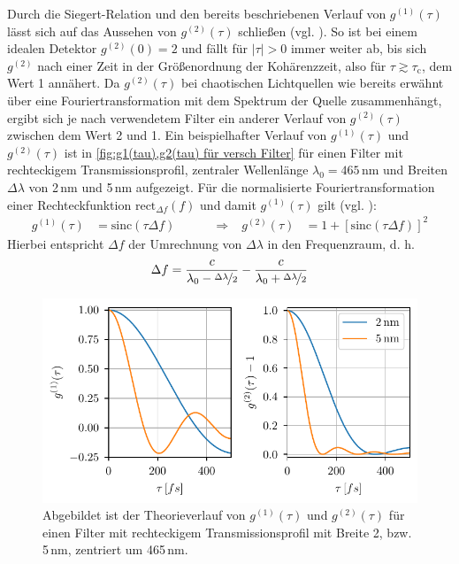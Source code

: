 Durch die Siegert-Relation und den bereits beschriebenen Verlauf von $g^{(1)}(\tau)$ lässt sich auf das Aussehen von $g^{(2)}(\tau)$ schließen (vgl. \cite[Kap. 6.3]{foxQuantumOpticsIntroduction2006}). 
So ist bei einem idealen Detektor $g^{(2)}(0)=2$ und fällt für $|\tau|>0$ immer weiter ab, bis sich $g^{(2)}$ nach einer Zeit in der Größenordnung der Kohärenzzeit, also für $\tau\gtrsim\tau_{\mathrm{c}}$, dem Wert 1 annähert. 
Da $g^{(2)}(\tau)$ bei chaotischen Lichtquellen wie bereits erwähnt über eine Fouriertransformation mit dem Spektrum der Quelle zusammenhängt, ergibt sich je nach verwendetem Filter ein anderer Verlauf von $g^{(2)}(\tau)$ zwischen dem Wert 2 und 1. 
Ein beispielhafter Verlauf von $g^{(1)}(\tau)$ und $g^{(2)}(\tau)$ ist in \autoref{fig:g1(tau),g2(tau) für versch Filter} für einen Filter mit rechteckigem Transmissionsprofil, zentraler Wellenlänge $\lambda_0 = 465\,\mathrm{nm}$ und Breiten $\Delta\lambda$ von 2\,nm und 5\,nm aufgezeigt. 
Für die normalisierte Fouriertransformation einer Rechteckfunktion $\mathrm{rect}_{\Delta f}\left(f\right)$ und damit $g^{(1)}(\tau)$ gilt (vgl. \cite[Kap. 3.2]{wangIntroductionOrthogonalTransforms2012}):
\begin{align}
    g^{(1)}(\tau) &= \mathrm{sinc}\left(\tau\Delta f\right) \quad\quad\quad \Rightarrow& g^{(2)}(\tau) &= 1+ \left[\mathrm{sinc}\left(\tau\Delta f\right)\right]^2
\end{align}
Hierbei entspricht $\Delta f$ der Umrechnung von $\Delta\lambda$ in den Frequenzraum, d. h. 
\begin{equation}
    \Delta f = \frac{c}{\lambda_0 - \nicefrac{\Delta\lambda}{2}} - \frac{c}{\lambda_0 + \nicefrac{\Delta\lambda}{2}}
\end{equation}
\begin{figure}[h]
    \centering
    \includegraphics{images/Theorie/g1_g2_tau.pdf}
    \caption{Abgebildet ist der Theorieverlauf von $g^{(1)}(\tau)$ und $g^{(2)}(\tau)$ für einen Filter mit rechteckigem Transmissionsprofil mit Breite 2, bzw. 5\,nm, zentriert um 465\,nm.}
    \label{fig:g1(tau),g2(tau) für versch Filter}
\end{figure}
